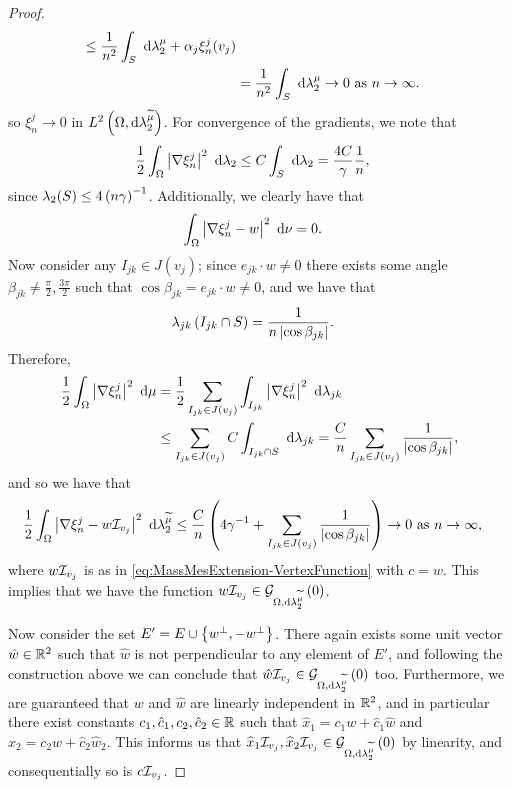 \begin{proof}
\begin{align*}
		\leq \frac{1}{n^2}\int_{S} \ \mathrm{d}\lambda_2^{\mu} + \alpha_j\xi_n^j(v_j) \\
		&= \frac{1}{n^2}\int_{S} \ \mathrm{d}\lambda_2^{\mu} \rightarrow 0 \ \text{as} \ n \rightarrow\infty.
	\end{align*}
	so $\xi_n^j\rightarrow0$ in $L^{2}\left( \Omega,\mathrm{d} \lambda_2^{\widetilde{\mu}} \right)$.
	For convergence of the gradients, we note that
	\begin{align*}
		\frac{1}{2}\int_{\Omega}\left\lvert \nabla\xi_n^j \right\rvert^2 \ \mathrm{d}\lambda_2
		&\leq C\int_{S} \ \mathrm{d}\lambda_2 = \frac{4C}{\gamma}\frac{1}{n},
	\end{align*}
	since $\lambda_2(S)\leq 4\left( n\gamma \right)^{-1}$.
	Additionally, we clearly have that
	\begin{align*}
		\int_{\Omega}\left\lvert \nabla\xi_n^j - w \right\rvert^2 \ \mathrm{d}\nu &= 0.
	\end{align*}
	Now consider any $I_{jk}\in J(v_j)$; since $e_{jk}\cdot w\neq 0$ there exists some angle $\beta_{jk}\neq\frac{\pi}{2},\frac{3\pi}{2}$ such that $\cos\beta_{jk}=e_{jk}\cdot w\neq 0$, and we have that
	\begin{align*}
		\lambda_{jk}\left( I_{jk}\cap S \right) &= \frac{1}{n\left\lvert \cos\beta_{jk} \right\rvert}.
	\end{align*}
	Therefore,
	\begin{align*}
		\frac{1}{2}\int_{\Omega}\left\lvert \nabla\xi_n^j \right\rvert^2 \ \mathrm{d}\mu
		&= \frac{1}{2}\sum_{I_{jk}\in J(v_j)} \int_{I_{jk}}\left\lvert \nabla\xi_n^j \right\rvert^2 \ \mathrm{d}\lambda_{jk} \\
		&\leq \sum_{I_{jk}\in J(v_j)} C\int_{I_{jk}\cap S} \ \mathrm{d}\lambda_{jk}
		= \frac{C}{n} \sum_{I_{jk}\in J(v_j)} \frac{1}{\left\lvert \cos\beta_{jk} \right\rvert},
	\end{align*}
	and so we have that
	\begin{align*}
		\frac{1}{2}\int_{\Omega}\left\lvert \nabla\xi_n^j - w\mathcal{I}_{v_j} \right\rvert^2 \ \mathrm{d}\lambda_2^{\widetilde{\mu}}
		&\leq \frac{C}{n}\left(  4\gamma^{-1} + \sum_{I_{jk}\in J(v_j)} \frac{1}{\left\lvert \cos\beta_{jk} \right\rvert}  \right)
		\rightarrow0 \ \text{as} \ n \rightarrow\infty,
	\end{align*}
	where $w\mathcal{I}_{v_j}$ is as in \eqref{eq:MassMesExtension-VertexFunction} with $c=w$.
	This implies that we have the function $w\mathcal{I}_{v_j}\in\mathcal{G}_{ \Omega, \mathrm{d}\lambda_2^{\widetilde{\mu}}}\left( 0 \right)$.
	
	Now consider the set $E' = E \cup \left\{ w^{\perp}, -w^{\perp} \right\}$.
	There again exists some unit vector $\hat{w}\in\mathbb{R}^2$ such that $\hat{w}$ is not perpendicular to any element of $E'$, and following the construction above we can conclude that $\hat{w}\mathcal{I}_{v_j}\in\mathcal{G}_{ \Omega, \mathrm{d}\lambda_2^{\widetilde{\mu}}}\left( 0 \right)$ too.
	Furthermore, we are guaranteed that $w$ and $\hat{w}$ are linearly independent in $\mathbb{R}^2$, and in particular there exist constants $c_1,\hat{c}_1,c_2,\hat{c}_2\in\mathbb{R}$ such that $\widehat{x}_1 = c_1 w + \hat{c}_1\hat{w}$ and $\widehat{x}_2 = c_2 w + \hat{c}_2\hat{w}_2$.
	This informs us that $\widehat{x}_1\mathcal{I}_{v_j}, \widehat{x}_2\mathcal{I}_{v_j}\in\mathcal{G}_{ \Omega, \mathrm{d}\lambda_2^{\widetilde{\mu}}}\left( 0 \right)$ by linearity, and consequentially so is $c\mathcal{I}_{v_j}$.
\end{proof}

